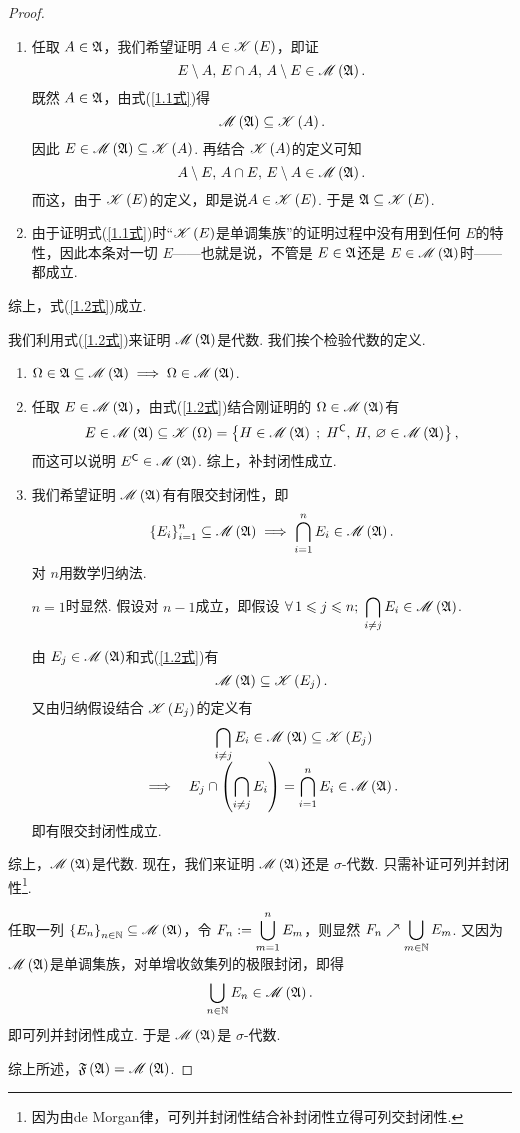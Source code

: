 \begin{proof}
    \begin{enumerate}
        \item 任取 $A\in\mfA$，我们希望证明 $A\in\msK\z(E\y)$，即证
        \[ E\m A,\,E\cap A,\,A\m E\in\msM\z(\mfA\y). \]
        既然 $A\in\mfA$，由式(\ref{1.1式})得
        \[ \msM\z(\mfA\y)\sb\msK\z(A\y). \]
        因此 $E\in\msM\z(\mfA\y)\sb\msK\z(A\y)$. 再结合 $\msK\z(A\y)$的定义可知
        \[ A\m E,\,A\cap E,\,E\m A\in\msM\z(\mfA\y). \]
        而这，由于 $\msK\z(E\y)$的定义，即是说$ A\in\msK\z(E\y) $. 于是 $\mfA\sb\msK\z(E\y)$.
        \item 由于证明式(\ref{1.1式})时“$\msK\z(E\y)$是单调集族”的证明过程中没有用到任何 $E$的特性，因此本条对一切 $E$——也就是说，不管是 $E\in\mfA$还是 $E\in\msM\z(\mfA\y)$时——都成立.
    \end{enumerate}
    综上，式(\ref{1.2式})成立.
    
    我们利用式(\ref{1.2式})来证明 $\msM\z(\mfA\y)$是代数. 我们挨个检验代数的定义.
    \begin{enumerate}
        \item $\Omega\in\mfA\sb\msM\z(\mfA\y)\implies\Omega\in\msM\z(\mfA\y)$.
        \item 任取 $E\in\msM\z(\mfA\y)$，由式(\ref{1.2式})结合刚证明的 $\Omega\in\msM\z(\mfA\y)$有
        \[ E\in\msM\z(\mfA\y)\sb\msK\z(\Omega\y)=\z\{ H\in\msM\z(\mfA\y)\;;\;H\c,\,H,\,\vd\in\msM\z(\mfA\y) \y\}, \]
        而这可以说明 $E\c\in\msM\z(\mfA\y)$. 综上，补封闭性成立.
        \item 我们希望证明 $\msM\z(\mfA\y)$有有限交封闭性，即
        \[ \z\{E_i\y\}_{i=1}^n\sb\msM\z(\mfA\y)\implies\bcap_{i=1}^n E_i\in\msM\z(\mfA\y). \]
        对 $n$用数学归纳法.
        
        $n=1$时显然. 假设对 $n-1$成立，即假设 $\forall\,1\le j\le n;\;\displaystyle \bcap_{i\ne j}E_i\in \msM\z(\mfA\y)$. 

        由 $E_j\in\msM\z(\mfA\y)$和式(\ref{1.2式})有
        \[\msM\z(\mfA\y)\sb\msK\z(E_j\y).\]
        又由归纳假设结合 $\msK\z(E_j\y)$的定义有
        \[\begin{array}{lc}
             & \displaystyle \bcap_{i\ne j} E_i \in\msM\z(\mfA\y)\sb\msK\z(E_j\y) \\
           \implies & \displaystyle E_j\cap\z( \bcap_{i\ne j} E_i \y)=\bcap_{i=1}^n E_i\in\msM\z(\mfA\y).
        \end{array}\]
        即有限交封闭性成立.
    \end{enumerate}
    综上，$\msM\z(\mfA\y)$是代数. 现在，我们来证明 $\msM\z(\mfA\y)$还是 $\sigma$-代数. 只需补证可列并封闭性\footnote{因为由de Morgan律，可列并封闭性结合补封闭性立得可列交封闭性.}.
    
    任取一列 $\z\{E_n\y\}_{n\in\N}\sb\msM\z(\mfA\y)$，令 $F_n\defi \displaystyle \bcup_{m=1}^n E_m$，则显然 $F_n\nearrow\displaystyle \bcup_{m\in\N} E_m$. 又因为 $\msM\z(\mfA\y)$是单调集族，对单增收敛集列的极限封闭，即得
    \[ \bcup_{n\in\N}E_n\in\msM\z(\mfA\y). \]
    即可列并封闭性成立. 于是 $\msM\z(\mfA\y)$是 $\sigma$-代数.

    综上所述，$\mfF\z(\mfA\y)=\msM\z(\mfA\y)$.
\end{proof}
\vspace{0.5cm}

